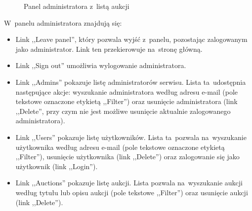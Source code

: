 \begin{figure}[h]
\centering
{}
\caption{Panel administratora z~listą aukcji}
\label{screen08}
\end{figure}

W~panelu administratora znajdują się:

\begin{itemize}
  \item Link ,,Leave panel'', który pozwala wyjść z~panelu, pozostając zalogowanym jako administrator. Link ten przekierowuje na~stronę główną.
  \item Link ,,Sign out'' umożliwia wylogowanie administratora.
  \item Link ,,Admins'' pokazuje listę administratorów serwisu. Lista ta~udostępnia następujące akcje: wyszukanie administratora według adresu e-mail (pole tekstowe oznaczone etykietą ,,Filter'') oraz usunięcie administratora (link ,,Delete'', przy czym nie jest możliwe usunięcie aktualnie zalogowanego administratora).
  \item Link ,,Users'' pokazuje listę użytkowników. Lista ta~pozwala na~wyszukanie użytkownika według adresu e-mail (pole tekstowe oznaczone etykietą ,,Filter''), usunięcie użytkownika (link ,,Delete'') oraz zalogowanie się jako użytkownik (link ,,Login'').
  \item Link ,,Auctions'' pokazuje listę aukcji. Lista pozwala na~wyszukanie aukcji według tytułu lub opisu aukcji (pole tekstowe ,,Filter'') oraz usunięcie aukcji (link ,,Delete'').
\end{itemize}
